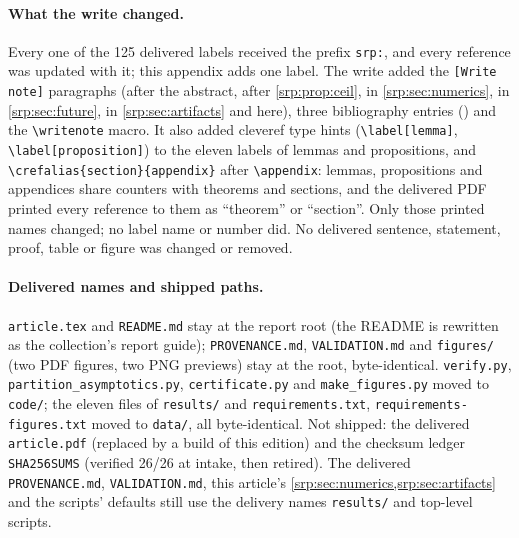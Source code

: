 \documentclass[11pt,a4paper]{article}
\numberwithin{equation}{section}
\theoremstyle{definition}
\theoremstyle{remark}
\newcommand{\writenote}[1]{\par\smallskip\noindent
 \textit{[Write note, batch 73O1, 1 October 2026.]}\ #1\par\smallskip}
\begin{document}
\paragraph{What the write changed.} Every one of the 125 delivered
labels received the prefix \texttt{srp:}, and every reference was
updated with it; this appendix adds one label. The write added the
\texttt{[Write note]} paragraphs (after the abstract, after
\cref{srp:prop:ceil}, in \cref{srp:sec:numerics}, in
\cref{srp:sec:future}, in \cref{srp:sec:artifacts} and here), three
bibliography entries (\cite{proveitTI,proveitLean,proveitGCC}) and the
\verb|\writenote| macro. It also added cleveref type hints
(\verb|\label[lemma]|, \verb|\label[proposition]|) to the eleven labels
of lemmas and propositions, and \verb|\crefalias{section}{appendix}|
after \verb|\appendix|: lemmas, propositions and appendices share
counters with theorems and sections, and the delivered PDF printed
every reference to them as ``theorem'' or ``section''. Only those
printed names changed; no label name or number did. No delivered
sentence, statement, proof, table or figure was changed or removed.

\paragraph{Delivered names and shipped paths.} \texttt{article.tex} and
\texttt{README.md} stay at the report root (the README is rewritten as
the collection's report guide); \texttt{PROVENANCE.md},
\texttt{VALIDATION.md} and \texttt{figures/} (two PDF figures, two PNG
previews) stay at the root, byte-identical. \texttt{verify.py},
\texttt{partition\_asymptotics.py}, \texttt{certificate.py} and
\texttt{make\_figures.py} moved to \texttt{code/}; the eleven files of
\texttt{results/} and \texttt{requirements.txt},
\texttt{requirements-figures.txt} moved to \texttt{data/}, all
byte-identical. Not shipped: the delivered \texttt{article.pdf} (replaced
by a build of this edition) and the checksum ledger
\texttt{SHA256SUMS} (verified 26/26 at intake, then retired). The
delivered \texttt{PROVENANCE.md}, \texttt{VALIDATION.md}, this article's
\cref{srp:sec:numerics,srp:sec:artifacts} and the scripts' defaults still
use the delivery names \texttt{results/} and top-level scripts.
\end{document}

